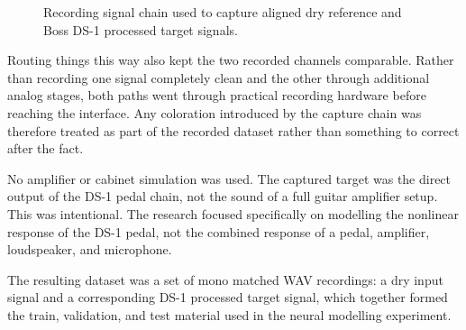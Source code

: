 \begin{figure}[tbp]
  \centering
  \caption{Recording signal chain used to capture aligned dry reference and Boss DS-1 processed target signals.}
  \label{fig:recording-signal-chain}
\end{figure}

Routing things this way also kept the two recorded channels comparable. Rather than recording one signal completely clean and the other through additional analog stages, both paths went through practical recording hardware before reaching the interface. Any coloration introduced by the capture chain was therefore treated as part of the recorded dataset rather than something to correct after the fact.

No amplifier or cabinet simulation was used. The captured target was the direct output of the DS-1 pedal chain, not the sound of a full guitar amplifier setup. This was intentional. The research focused specifically on modelling the nonlinear response of the DS-1 pedal, not the combined response of a pedal, amplifier, loudspeaker, and microphone.

The resulting dataset was a set of mono matched WAV recordings: a dry input signal and a corresponding DS-1 processed target signal, which together formed the train, validation, and test material used in the neural modelling experiment.
